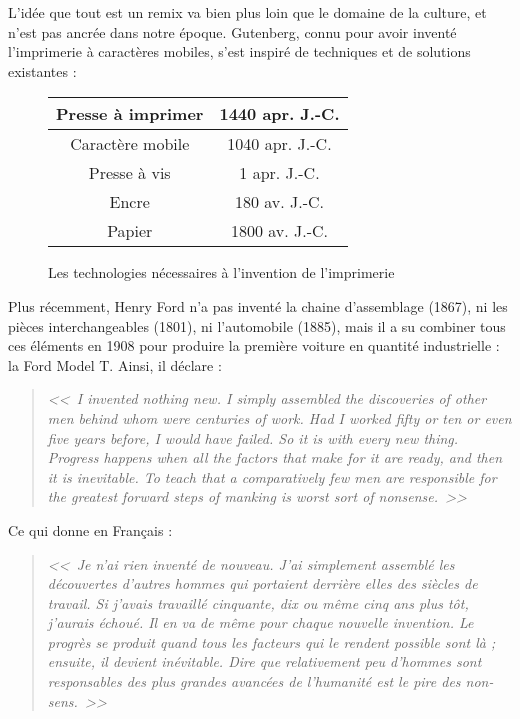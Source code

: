 L'idée que tout est un remix va bien plus loin que le domaine de la culture, et n'est pas ancrée dans notre époque. Gutenberg, connu pour avoir inventé l'imprimerie à caractères mobiles, s'est inspiré de techniques et de solutions existantes :

\begin{figure}[H]
\center
\begin{tabular}{c|c}
Presse à imprimer & 1440 apr. J.-C. \\
\hline
Caractère mobile & 1040 apr. J.-C. \\
Presse à vis & 1 apr. J.-C. \\
Encre & 180 av. J.-C. \\
Papier & 1800 av. J.-C.
\end{tabular}
\caption{Les technologies nécessaires à l'invention de l'imprimerie}
\end{figure}

Plus récemment, Henry Ford n'a pas inventé la chaine d'assemblage (1867), ni les pièces interchangeables (1801), ni l'automobile (1885), mais il a su combiner tous ces éléments en 1908 pour produire la première voiture en quantité industrielle : la Ford Model T.
Ainsi, il déclare :

\label{ford}
\begin{quotation}
\begin{flushright}
\textit{<<~I invented nothing new.
I simply assembled the discoveries of other men behind whom were centuries of work.
Had I worked fifty or ten or even five years before, I would have failed.
So it is with every new thing.
Progress happens when all the factors that make for it are ready, and then it is inevitable.
To teach that a comparatively few men are responsible for the greatest forward steps of manking is worst sort of nonsense.~>>}
\end{flushright}
\end{quotation}

Ce qui donne en Français :

\begin{quotation}
\begin{flushright}
\textit{<<~Je n'ai rien inventé de nouveau.
J'ai simplement assemblé les découvertes d'autres hommes qui portaient derrière elles des siècles de travail.
Si j'avais travaillé cinquante, dix ou même cinq ans plus tôt, j'aurais échoué.
Il en va de même pour chaque nouvelle invention.
Le progrès se produit quand tous les facteurs qui le rendent possible sont là ; ensuite, il devient inévitable.
Dire que relativement peu d'hommes sont responsables des plus grandes avancées de l'humanité est le pire des non-sens.~>>}
\end{flushright}
\end{quotation}

